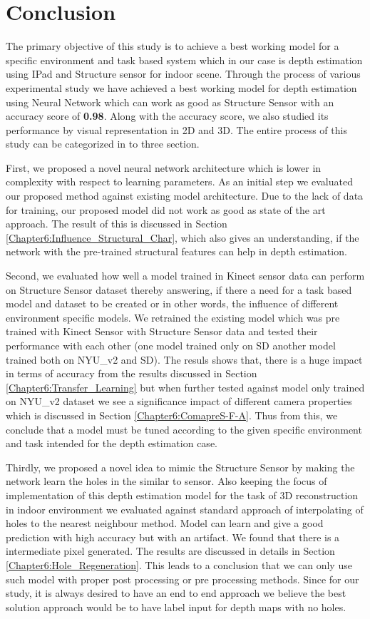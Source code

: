 

\chapter{Conclusion}
\label{Chaptee7:Concluion}
The primary objective of this study is to achieve a best working model for a specific environment and task based system which in our case is depth estimation using IPad and Structure sensor for indoor scene. Through the process of various experimental study we have achieved a best working model for depth estimation using Neural Network which can work as good as Structure Sensor with an accuracy score of \textbf{0.98}. Along with the accuracy score, we also studied its performance by visual representation in 2D and 3D. The entire process of this study can be categorized in to three section.

First, we proposed a novel neural network architecture which is lower in complexity with respect to learning parameters. As an initial step we evaluated our proposed method against existing model architecture. Due to the lack of data for training, our proposed model did not work as good as state of the art approach. The result of this is discussed in Section \ref{Chapter6:Influence_Structural_Char}, which also gives an understanding, if the network with the pre-trained structural features can help in depth estimation. 

Second, we evaluated how well a model trained in Kinect sensor data can perform on Structure Sensor dataset thereby answering, if there a need for a task based model and dataset to be created or in other words, the influence of different environment specific models. We retrained the existing model which was pre trained with Kinect Sensor with Structure Sensor data and tested their performance with each other (one model trained only on SD another model trained both on NYU\_v2 and SD). The resuls shows that, there is a huge impact in terms of accuracy from the results discussed in Section \ref{Chapter6:Transfer_Learning} but when further tested against model only trained on NYU\_v2 dataset we see a significance impact of different camera properties which is discussed in Section \ref{Chapter6:ComapreS-F-A}. Thus from this, we conclude that a model must be tuned according to the given specific environment and task intended for the depth estimation case.

Thirdly, we proposed a novel idea to mimic the Structure Sensor by making the network learn the holes in the similar to sensor. Also keeping the focus of implementation of this depth estimation model for the task of 3D reconstruction in indoor environment we evaluated against standard approach of interpolating of holes to the nearest neighbour method. Model can learn and give a good prediction with high accuracy but with an artifact. We found that there is a intermediate pixel generated. The results are discussed in details in Section \ref{Chapter6:Hole_Regeneration}. This leads to a conclusion that we can only use such model with proper post processing or pre processing methods. Since for our study, it is always desired to have an end to end approach we believe the best solution approach would be to have label input for depth maps with no holes. 

